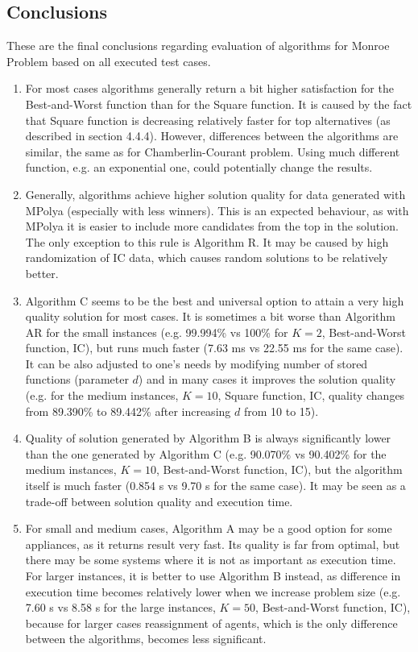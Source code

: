 \subsection{Conclusions}

These are the final conclusions regarding evaluation of algorithms for Monroe Problem based on all executed test cases.

\begin{enumerate}
	\item For most cases algorithms generally return a bit higher satisfaction for the Best-and-Worst function than for the Square function. It is caused by the fact that Square function is decreasing relatively faster for top alternatives (as described in section 4.4.4). However, differences between the algorithms are similar, the same as for Chamberlin-Courant problem. Using much different function, e.g. an exponential one, could potentially change the results.
	\item Generally, algorithms achieve higher solution quality for data generated with MPolya (especially with less winners). This is an expected behaviour, as with MPolya it is easier to include more candidates from the top in the solution. The only exception to this rule is Algorithm R. It may be caused by high randomization of IC data, which causes random solutions to be relatively better.
	\item Algorithm C seems to be the best and universal option to attain a very high quality solution for most cases. It is sometimes a bit worse than Algorithm AR for the small instances (e.g. 99.994\% vs 100\% for $K = 2$, Best-and-Worst function, IC), but runs much faster (7.63 ms vs 22.55 ms for the same case). It can be also adjusted to one's needs by modifying number of stored functions (parameter $d$) and in many cases it improves the solution quality (e.g. for the medium instances, $K = 10$, Square function, IC, quality changes from 89.390\% to 89.442\% after increasing $d$ from 10 to 15).
	\item Quality of solution generated by Algorithm B is always significantly lower than the one generated by Algorithm C (e.g. 90.070\% vs 90.402\% for the medium instances, $K = 10$, Best-and-Worst function, IC), but the algorithm itself is much faster (0.854 s vs 9.70 s for the same case). It may be seen as a trade-off between solution quality and execution time.
	\item For small and medium cases, Algorithm A may be a good option for some appliances, as it returns result very fast. Its quality is far from optimal, but there may be some systems where it is not as important as execution time. For larger instances, it is better to use Algorithm B instead, as difference in execution time becomes relatively lower when we increase problem size (e.g. 7.60 s vs 8.58 s for the large instances, $K = 50$, Best-and-Worst function, IC), because for larger cases reassignment of agents, which is the only difference between the algorithms, becomes less significant.

\end{enumerate}
